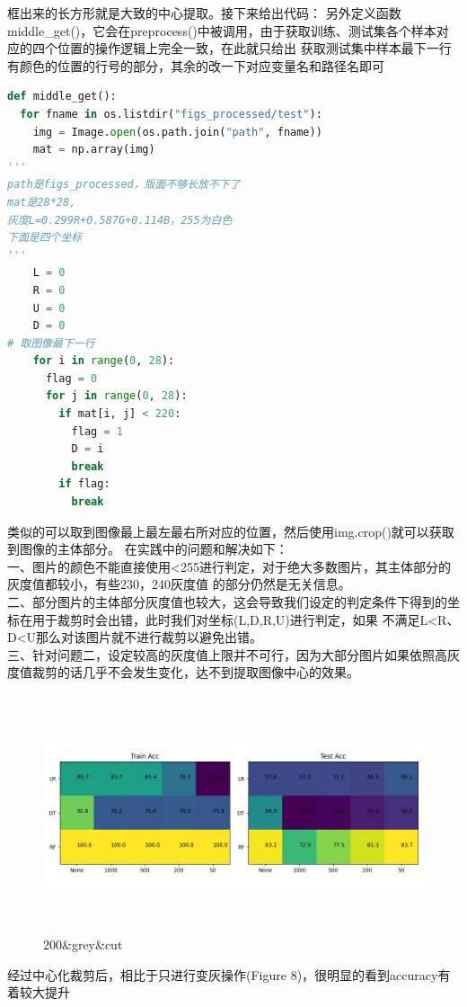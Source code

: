 \documentclass[answers]{exam}  %
\begin{document}
\begin{questions}
框出来的长方形就是大致的中心提取。接下来给出代码：
另外定义函数middle\_get()，它会在preprocess()中被调用，由于获取训练、测试集各个样本对应的四个位置的操作逻辑上完全一致，在此就只给出
获取测试集中样本最下一行有颜色的位置的行号的部分，其余的改一下对应变量名和路径名即可
\newpage
\begin{lstlisting}[language={Python}]
def middle_get():
  for fname in os.listdir("figs_processed/test"):
    img = Image.open(os.path.join("path", fname))
    mat = np.array(img)  
'''
path是figs_processed，版面不够长放不下了
mat是28*28,
灰度L=0.299R+0.587G+0.114B，255为白色
下面是四个坐标
'''
    L = 0
    R = 0
    U = 0
    D = 0
# 取图像最下一行
    for i in range(0, 28):
      flag = 0
      for j in range(0, 28):
  	    if mat[i, j] < 220:
  	      flag = 1
		  D = i
		  break
	    if flag:
	 	  break
\end{lstlisting}
类似的可以取到图像最上最左最右所对应的位置，然后使用img.crop()就可以获取到图像的主体部分。
在实践中的问题和解决如下：\\
一、图片的颜色不能直接使用<255进行判定，对于绝大多数图片，其主体部分的灰度值都较小，有些230，240灰度值
的部分仍然是无关信息。\\
二、部分图片的主体部分灰度值也较大，这会导致我们设定的判定条件下得到的坐标在用于裁剪时会出错，此时我们对坐标(L,D,R,U)进行判定，如果
不满足L<R、D<U那么对该图片就不进行裁剪以避免出错。\\
三、针对问题二，设定较高的灰度值上限并不可行，因为大部分图片如果依照高灰度值裁剪的话几乎不会发生变化，达不到提取图像中心的效果。
\newpage
\begin{figure}[h]
	\centering
	\includegraphics[width=15cm,height=7cm]{problem2-code/200-grey-cut.jpg}
	\caption{200\&grey\&cut}
\end{figure}
经过中心化裁剪后，相比于只进行变灰操作(Figure 8)，很明显的看到accuracy有着较大提升\\

\end{questions}
\end{document}
